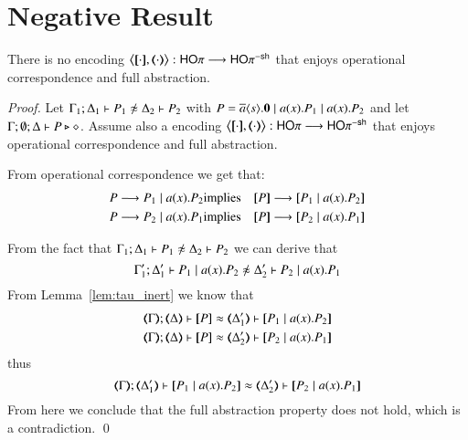 \section{Negative Result}
\label{app:neg}

\begin{theorem}\rm
	There is no encoding $\enc{\cdot}{\cdot}: \HOp \longrightarrow \HOp^{\minussh}$
	that enjoys operational correspondence and full abstraction.
\end{theorem}

\begin{proof}
	Let $\horel{\Gamma_1}{\Delta_1}{P_1}{\not\wb}{\Delta_2}{P_2}$
	with $P = \overline{a} \langle s \rangle . \mathbf{0} \;|\; a (x) . P_1 \;|\; a (x) . P_2$ and
	let $\Gamma; \emptyset; \Delta \vdash P \triangleright \diamond$.
	Assume also a encoding
	$\enc{\cdot}{\cdot}: \HOp \longrightarrow \HOp^{\minussh}$
	that enjoys
	operational correspondence and full abstraction.

	From operational correspondence we get that:
	\begin{eqnarray*}
		P \red P_1 \Par \bacc{a}{x} P_2 &\textrm{implies}& \map{P} \red \map{P_1 \Par \bacc{a}{x} P_2}\\
		P \red P_2 \Par \bacc{a}{x} P_1 &\textrm{implies}& \map{P} \red \map{P_2 \Par \bacc{a}{x} P_1}
	\end{eqnarray*}

	From the fact that
	$\horel{\Gamma_1}{\Delta_1}{P_1}{\not\wb}{\Delta_2}{P_2}$
	we can derive that
%
	\[
		\horel{\Gamma_1'}{\Delta_1'}{P_1 \Par \bacc{a}{x} P_2}{\not\wb}{\Delta_2'}{P_2 \Par \bacc{a}{x} P_1}
	\]
%
	From Lemma~\ref{lem:tau_inert} we know that
%
	\begin{eqnarray*}
		\horel{\mapt{\Gamma}}{\mapt{\Delta}}{\map{P}}{\wb}{\mapt{\Delta_1'}}{\map{P_1 \Par \bacc{a}{x} P_2}}\\
		\horel{\mapt{\Gamma}}{\mapt{\Delta}}{\map{P}}{\wb}{\mapt{\Delta_2'}}{\map{P_2 \Par \bacc{a}{x} P_1}}
	\end{eqnarray*}
%
	\noi thus
	\[
		\horel{\mapt{\Gamma}}{\mapt{\Delta_1'}}{\map{P_1 \Par \bacc{a}{x} P_2}}{\wb}{\mapt{\Delta_2'}}{\map{P_2 \Par \bacc{a}{x} P_1}}
	\]
%
	From here we conclude that the full abstraction property does not hold,
	which is a contradiction.
	\qed
\end{proof}
